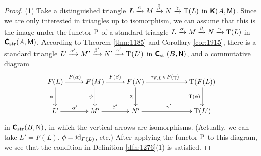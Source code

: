 \begin{proof} \mbox{}

\smallskip \noindent 
(1) Take a distinguished triangle 
$L \xrightarrow{\bar{\alpha}} M \xrightarrow{\bar{\beta}} N \xrightarrow{\bar{\gamma}} \operatorname{T}(L)$
in $\boldsymbol{\mathsf{K}}(A, \operatorname{\mathsf{M}})$. Since we are only interested in triangles up to 
isomorphism, we can assume that this is the image under the functor $\operatorname{P}$ 
of a standard triangle  
$L \xrightarrow{\alpha} M \xrightarrow{\beta} N \xrightarrow{\gamma} \operatorname{T}(L)$
in $\boldsymbol{\mathsf{C}}_{\mathrm{str}}(A, \operatorname{\mathsf{M}})$. According to Theorem \ref{thm:1185}
and Corollary \ref{cor:1915}, 
there is a  standard triangle  
$L' \xrightarrow{\alpha'} M' \xrightarrow{\beta'} N' \xrightarrow{\gamma'} \operatorname{T}(L')$
in $\boldsymbol{\mathsf{C}}_{\mathrm{str}}(B, \operatorname{\mathsf{N}})$, and a commutative diagram 
\[ \UseTips  \xymatrix @C=6ex @R=6ex { 
F(L) 
\ar[r]^{F(\al)}
\ar[d]_{\phi}
&
F(M) 
\ar[r]^{F(\be)}
\ar[d]_{\psi}
& 
F(N)
\ar[rr]^(0.44){\tau_{F, L} \, \circ \, F(\ga)}
\ar[d]_{\chi}
&
&
\opn{T}( F(L))
\ar[d]_{\opn{T}(\phi)}
\\
L' 
\ar[r]^{\al'}
&
M'
\ar[r]^{\be'}
& 
N'
\ar[rr]^{\ga'}
&
&
\opn{T}(L') 
} \]
in $\boldsymbol{\mathsf{C}}_{\mathrm{str}}(B, \operatorname{\mathsf{N}})$,
in which the vertical arrows are isomorphisms. (Actually, we can take 
$L' = F(L)$, $\phi = \operatorname{id}_{F(L)}$, etc.) 
After applying the functor $\operatorname{P}$ to this diagram, we see that the condition 
in Definition \ref{dfn:1276}(1) is satisfied. 


\end{proof}
